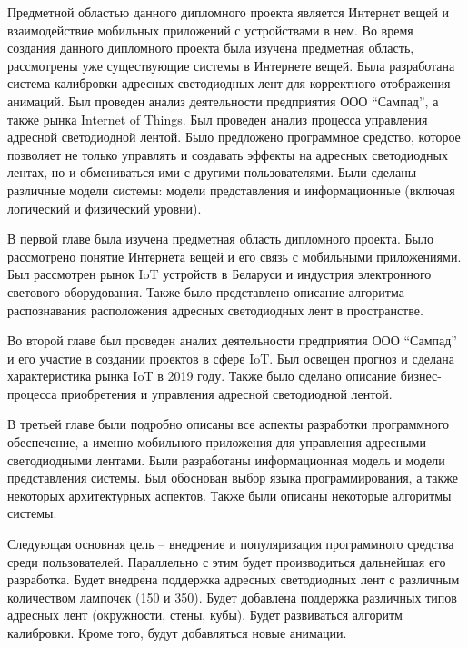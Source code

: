 Предметной областью данного дипломного проекта является Интернет вещей и взаимодействие мобильных приложений с устройствами в нем. Во время создания данного дипломного проекта была изучена предметная область, рассмотрены уже существующие системы в Интернете вещей. Была разработана система калибровки адресных светодиодных лент для корректного отображения анимаций. Был проведен анализ деятельности предприятия ООО \enquote{Сампад}, а также рынка Internet of Things. Был проведен анализ процесса управления адресной светодиодной лентой. Было предложено программное средство, которое позволяет не только управлять и создавать эффекты на адресных светодиодных лентах, но и обмениваться ими с другими пользователями. Были сделаны различные модели системы: модели представления и информационные (включая логический и физический уровни).%

В первой главе была изучена предметная область дипломного проекта. Было рассмотрено понятие Интернета вещей и его связь с мобильными приложениями. Был рассмотрен рынок IoT устройств в Беларуси и индустрия электронного светового оборудования. Также было представлено описание алгоритма распознавания расположения адресных светодиодных лент в пространстве.

Во второй главе был проведен аналих деятельности предприятия ООО \enquote{Сампад} и его участие в создании проектов в сфере IoT. Был освещен прогноз и сделана характеристика рынка IoT в 2019 году. Также было сделано описание бизнес-процесса приобретения и управления адресной светодиодной лентой.

В третьей главе были подробно описаны все аспекты разработки программного обеспечение, а именно мобильного приложения для управления адресными светодиодными лентами. Были разработаны информационная модель и модели представления системы. Был обоснован выбор языка программирования, а также некоторых архитектурных аспектов. Также были описаны некоторые алгоритмы системы.

Следующая основная цель -- внедрение и популяризация программного средства среди пользователей. Параллельно с этим будет производиться дальнейшая его разработка. Будет внедрена поддержка адресных светодиодных лент с различным количеством лампочек (150 и 350). Будет добавлена поддержка различных типов адресных лент (окружности, стены, кубы). Будет развиваться алгоритм калибровки. Кроме того, будут добавляться новые анимации.
